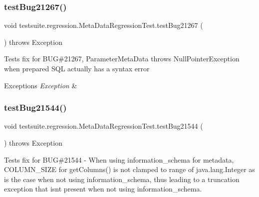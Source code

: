 \subsubsection{\texorpdfstring{test\+Bug21267()}{testBug21267()}}
{\footnotesize\ttfamily void testsuite.\+regression.\+Meta\+Data\+Regression\+Test.\+test\+Bug21267 (\begin{DoxyParamCaption}{ }\end{DoxyParamCaption}) throws Exception}

Tests fix for B\+UG\#21267, Parameter\+Meta\+Data throws Null\+Pointer\+Exception when prepared S\+QL actually has a syntax error


\begin{DoxyExceptions}{Exceptions}
{\em Exception} & \\
\hline
\end{DoxyExceptions}
\mbox{\label{classtestsuite_1_1regression_1_1_meta_data_regression_test_ad063a1590627c6505de6ff9a64d90ab8}} 
\subsubsection{\texorpdfstring{test\+Bug21544()}{testBug21544()}}
{\footnotesize\ttfamily void testsuite.\+regression.\+Meta\+Data\+Regression\+Test.\+test\+Bug21544 (\begin{DoxyParamCaption}{ }\end{DoxyParamCaption}) throws Exception}

Tests fix for B\+UG\#21544 -\/ When using information\+\_\+schema for metadata, C\+O\+L\+U\+M\+N\+\_\+\+S\+I\+ZE for get\+Columns() is not clamped to range of java.\+lang.\+Integer as is the case when not using information\+\_\+schema, thus leading to a truncation exception that isn\textquotesingle{}t present when not using information\+\_\+schema.


